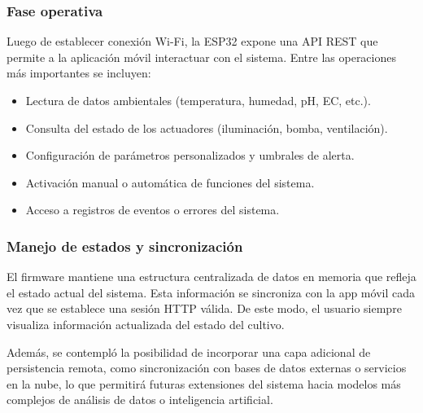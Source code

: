 \subsubsection{Fase operativa}
Luego de establecer conexión Wi-Fi, la ESP32 expone una API REST que permite a la aplicación móvil interactuar con el sistema. Entre las operaciones más importantes se incluyen:

\begin{itemize}
	\item Lectura de datos ambientales (temperatura, humedad, pH, EC, etc.).
	\item Consulta del estado de los actuadores (iluminación, bomba, ventilación).
	\item Configuración de parámetros personalizados y umbrales de alerta.
	\item Activación manual o automática de funciones del sistema.
	\item Acceso a registros de eventos o errores del sistema.
\end{itemize}

\subsubsection{Manejo de estados y sincronización}
El firmware mantiene una estructura centralizada de datos en memoria que refleja el estado actual del sistema. Esta información se sincroniza con la app móvil cada vez que se establece una sesión HTTP válida. De este modo, el usuario siempre visualiza información actualizada del estado del cultivo.

Además, se contempló la posibilidad de incorporar una capa adicional de persistencia remota, como sincronización con bases de datos externas o servicios en la nube, lo que permitirá futuras extensiones del sistema hacia modelos más complejos de análisis de datos o inteligencia artificial.


